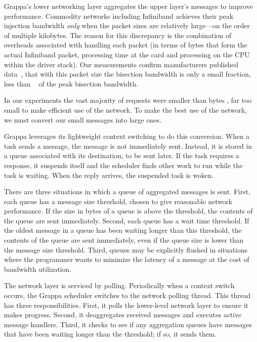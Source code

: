 Grappa's lower networking layer aggregates the upper layer's messages
to improve performance. Commodity networks including Infiniband
achieves their peak injection bandwidth \emph{only} when the packet
sizes are relatively large---on the order of multiple kilobytes. The
reason for this discrepancy is the combination of overheads associated
with handling each packet (in terms of bytes that form the actual
Infiniband packet, processing time at the card and processing on the
CPU within the driver stack). Our measurements confirm manufacturers
published data~\cite{infinibandbandwidth}, that with this packet size
the bisection bandwidth is only a small fraction, less than
~ of the peak bisection bandwidth.

In our experiments the vast majority of requests were smaller than
bytes , far too small to make efficient
use of the network. To make the best use of the network, we must
convert our small messages into large ones.

Grappa leverages its lightweight context switching to do this
conversion. When a task sends a message, the message is not
immediately sent. Instead, it is stored in a queue associated with its
destination, to be sent later. If the task requires a response, it
suspends itself and the scheduler finds other work to run while the
task is waiting. When the reply arrives, the suspended task is woken.

There are three situations in which a queue of aggregated messages is
sent. First, each queue has a message size threshold, chosen to give
reasonable network performance. If the size in bytes of a queue is
above the threshold, the contents of the queue are sent
immediately. Second, each queue has a wait time threshold. If the
oldest message in a queue has been waiting longer than this threshold,
the contents of the queue are sent immediately, even if the queue size
is lower than the message size threshold.  Third, queues may be
explicitly flushed in situations where the programmer wants to
minimize the latency of a message at the cost of bandwidth
utilization.

The network layer is serviced by polling. Periodically when a context
switch occurs, the Grappa scheduler switches to the network polling
thread. This thread has three responsibilities. First, it polls the
lower-level network layer to ensure it makes progress. Second, it
deaggregates received messages and executes active message
handlers. Third, it checks to see if any aggregation queues have
messages that have been waiting longer than the threshold; if so, it
sends them.

